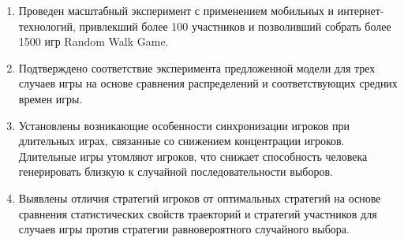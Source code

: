 \begin{enumerate}
  \item Проведен масштабный эксперимент с применением мобильных и интернет-технологий, привлекший более 100 участников и позволивший собрать более 1500 игр Random Walk Game. 
  \item Подтверждено соответствие эксперимента предложенной модели для трех случаев игры на основе сравнения распределений и соответствующих средних времен игры. 
  \item Установлены возникающие особенности синхронизации игроков при длительных играх, связанные со снижением концентрации игроков. Длительные игры утомляют игроков, что снижает способность человека генерировать близкую к случайной последовательности выборов.
  \item Выявлены отличия стратегий игроков от оптимальных стратегий на основе сравнения статистических свойств траекторий и стратегий участников для случаев игры против стратегии равновероятного случайного выбора.
\end{enumerate}
